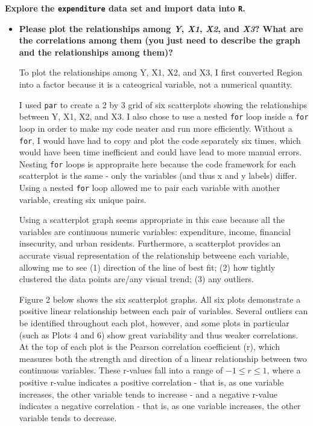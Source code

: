 \documentclass[12pt,letterpaper]{article}
\begin{document}
\vspace{.5cm}
\noindent \textbf{Explore the \texttt{expenditure} data set and import data into \texttt{R}.}
\vspace{.5cm}
  
\vspace{0cm}
\begin{itemize}

\item
\textbf{Please plot the relationships among \emph{Y}, \emph{X1}, \emph{X2}, and \emph{X3}? What are the correlations among them (you just need to describe the graph and the relationships among them)?}
\vspace{0cm}

To plot the relationships among Y, X1, X2, and X3, I first converted Region into a factor because it is a cateogrical variable, not a numerical quantity.



I used \texttt{par} to create a 2 by 3 grid of six scatterplots showing the relationships between Y, X1, X2, and X3. I also chose to use a nested \texttt{for} loop inside a \texttt{for} loop in order to make my code neater and run more efficiently. Without a \texttt{for}, I would have had to copy and plot the code separately six times, which would have been time inefficient and could have lead to more manual errors. Nesting \texttt{for} loops is appropraite here because the code framework for each scatterplot is the same - only the variables (and thus x and y labels) differ. Using a nested \texttt{for} loop allowed me to pair each variable with another variable, creating six unique pairs.



Using a scatterplot graph seems appropriate in this case because all the variables are continuous numeric variables: expenditure, income, financial insecurity, and urban residents. Furthermore, a scatterplot provides an accurate visual representation of the relationship betweene each variable, allowing me to see (1) direction of the line of best fit; (2) how tightly clustered the data points are/any visual trend; (3) any outliers.

Figure 2 below shows the six scatterplot graphs. All six plots demonstrate a positive linear relationship between each pair of variables. Several outliers can be identified throughout each plot, however, and some plots in particular (such as Plots 4 and 6) show great variability and thus weaker correlations. At the top of each plot is the Pearson correlation coefficient (r), which measures both the strength and direction of a linear relationship between two continuous variables. These r-values fall into a range of $-1 \le r \le 1$, where a positive r-value indicates a positive correlation - that is, as one variable increases, the other variable tends to increase - and a negative r-value indicates a negative correlation - that is, as one variable increases, the other variable tends to decrease.


\end{itemize}
\end{document}
